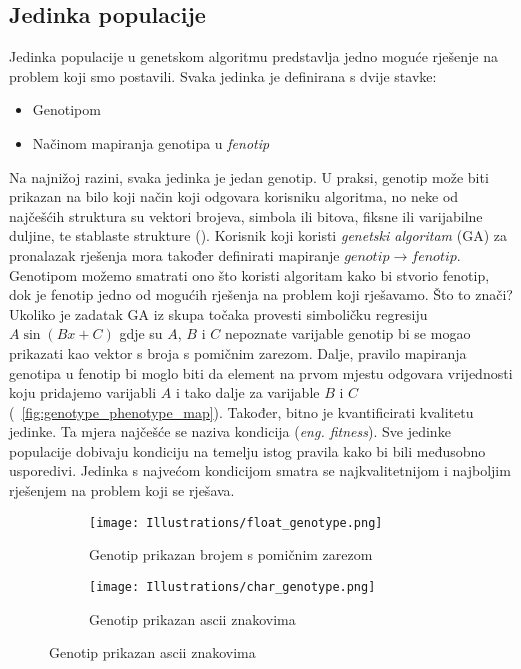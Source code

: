 \subsection{Jedinka populacije}
Jedinka populacije u genetskom algoritmu predstavlja jedno moguće rješenje na problem koji smo postavili.
Svaka jedinka je definirana s dvije stavke:
\begin{itemize}
	\item{Genotipom}
	\item{Načinom mapiranja genotipa u \emph{fenotip}}
\end{itemize}
Na najnižoj razini, svaka jedinka je jedan genotip. 
U praksi, genotip može biti prikazan na bilo koji način koji odgovara korisniku algoritma, no neke od najčešćih struktura su vektori brojeva, simbola ili bitova, fiksne ili varijabilne duljine, te stablaste strukture (\cite{naturally_selecting_algorithms}).
Korisnik koji koristi \emph{genetski algoritam} (GA) za pronalazak rješenja mora također definirati mapiranje $genotip \rightarrow fenotip$.
Genotipom možemo smatrati ono što koristi algoritam kako bi stvorio fenotip, dok je fenotip jedno od mogućih rješenja na problem koji rješavamo.
Što to znači?
Ukoliko je zadatak GA iz skupa točaka provesti simboličku regresiju $A\sin(Bx + C)$ gdje su $A$, $B$ i $C$ nepoznate varijable genotip bi se mogao prikazati kao vektor s broja s pomičnim zarezom.
Dalje, pravilo mapiranja genotipa u fenotip bi moglo biti da element na prvom mjestu odgovara vrijednosti koju pridajemo varijabli $A$ i tako dalje za varijable $B$ i $C$ (~\ref{fig:genotype_phenotype_map}).
Također, bitno je kvantificirati kvalitetu jedinke.
Ta mjera najčešće se naziva kondicija (\emph{eng. fitness}).
Sve jedinke populacije dobivaju kondiciju na temelju istog pravila kako bi bili međusobno usporedivi.
Jedinka s najvećom kondicijom smatra se najkvalitetnijom i najboljim rješenjem na problem koji se rješava.

\begin{figure}
	\caption{Mogućnosti spremanja i korištenja genotipa tijekom izvođenja genetskog algoritma}
	\begin{subfigure}[t]{0.45\textwidth}
		\texttt{[image: Illustrations/float\_genotype.png]}
		\caption{Genotip prikazan brojem s pomičnim zarezom}
	\end{subfigure}
	\hspace{\fill}
	\begin{subfigure}[t]{0.45\textwidth}
		\texttt{[image: Illustrations/char\_genotype.png]}
		\caption{Genotip prikazan ascii znakovima}
	\end{subfigure}
	\label{fig:genotype_types}
\end{figure}

